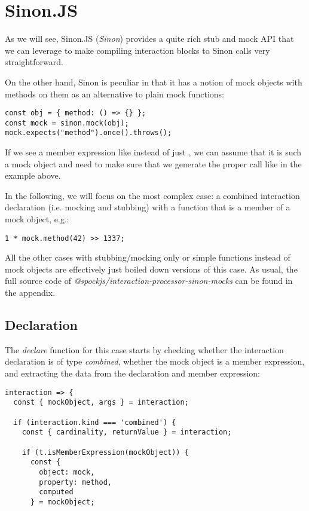 \section{Sinon.JS}
As we will see,
Sinon.JS (\textit{Sinon}) provides a
quite rich stub and mock API
that we can leverage to make
compiling interaction blocks
to Sinon calls very straightforward.

On the other hand,
Sinon is peculiar in that it has a notion of
mock objects with methods on them
as an alternative to plain mock functions:
\autocite{SinonMockDoc}
\begin{verbatim}
const obj = { method: () => {} };
const mock = sinon.mock(obj);
mock.expects("method").once().throws();
\end{verbatim}
If we see a member expression like
instead of just
,
we can assume that it is such a mock object
and need to make sure that
we generate the proper  call
like in the example above.

In the following,
we will focus on the most complex case:
a combined interaction declaration
(i.e. mocking and stubbing) with a
function that is a member of a mock object, e.g.:
\begin{verbatim}
1 * mock.method(42) >> 1337;
\end{verbatim}
All the other cases with
stubbing/mocking only
or simple functions
instead of mock objects
are effectively just
boiled down versions of this case.
As usual, the full source code of
\textit{@spockjs/interaction-processor-sinon-mocks}
can be found in the appendix.

\subsection{Declaration}
The \textit{declare} function for this case starts by
checking whether the interaction declaration is of type \textit{combined},
whether the mock object is a member expression, and
extracting the data from the declaration and member expression:
\begin{verbatim}
interaction => {
  const { mockObject, args } = interaction;

  if (interaction.kind === 'combined') {
    const { cardinality, returnValue } = interaction;

    if (t.isMemberExpression(mockObject)) {
      const {
        object: mock,
        property: method,
        computed
      } = mockObject;
\end{verbatim}


